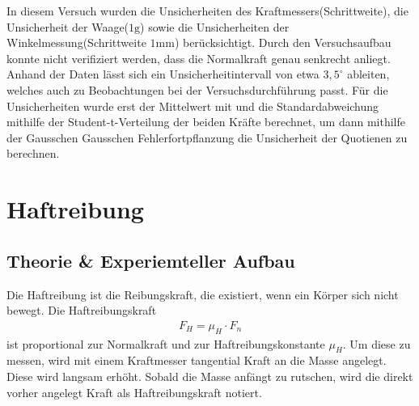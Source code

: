 \documentclass[11pt, a4paper]{article}
\begin{document}
    In diesem Versuch wurden die Unsicherheiten des Kraftmessers(Schrittweite), die Unsicherheit der Waage($1\si{\gram}$)
    sowie die Unsicherheiten der Winkelmessung(Schrittweite $1 \si{\milli\metre}$) berücksichtigt.
    Durch den Versuchsaufbau konnte nicht verifiziert werden, dass die Normalkraft genau senkrecht anliegt.
    Anhand der Daten lässt sich ein Unsicherheitintervall von etwa $3,5^{\circ}$ ableiten, welches auch zu
    Beobachtungen bei der Versuchsdurchführung passt. Für die Unsicherheiten wurde erst der Mittelwert \cite[(29)]{ABW} mit
    und die Standardabweichung mithilfe der Student-t-Verteilung \cite[(15)]{ABW} der beiden Kräfte berechnet, um dann mithilfe der Gausschen
    Gausschen Fehlerfortpflanzung \cite[(19)]{ABW} die Unsicherheit der Quotienen zu berechnen.

    \section{Haftreibung}
    \subsection{Theorie \& Experiemteller Aufbau}
    Die Haftreibung ist die Reibungskraft, die existiert, wenn ein Körper sich nicht bewegt.
    Die Haftreibungskraft
    \begin{align}
        F_H = \mu_H \cdot F_n
    \end{align}
    ist proportional zur Normalkraft und zur Haftreibungskonstante $\mu_H$. Um diese zu messen,
    wird mit einem Kraftmesser tangential Kraft an die Masse angelegt. Diese wird langsam erhöht.
    Sobald die Masse anfängt zu rutschen, wird die direkt vorher angelegt Kraft als Haftreibungskraft notiert.
\end{document}
